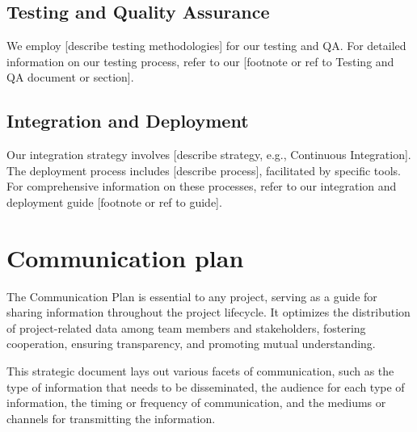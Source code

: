 \documentclass[10pt]{projectdoc}
\begin{document}
\subsection{Testing and Quality Assurance}

We employ [describe testing methodologies] for our testing and QA. For detailed information on our testing process, refer to our [footnote or ref to Testing and QA document or section].

\subsection{Integration and Deployment}

Our integration strategy involves [describe strategy, e.g., Continuous Integration]. The deployment process includes [describe process], facilitated by specific tools. For comprehensive information on these processes, refer to our integration and deployment guide [footnote or ref to guide].

\newpage
\section{Communication plan}

The Communication Plan is essential to any project, serving as a guide for sharing information throughout the project lifecycle. It optimizes the distribution of project-related data among team members and stakeholders, fostering cooperation, ensuring transparency, and promoting mutual understanding.

This strategic document lays out various facets of communication, such as the type of information that needs to be disseminated, the audience for each type of information, the timing or frequency of communication, and the mediums or channels for transmitting the information.
\end{document}
